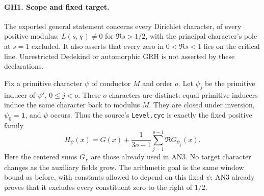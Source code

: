 \documentclass[11pt,a4paper]{article}
\numberwithin{equation}{section}
\theoremstyle{remark}\newtheorem{remark}[theorem]{Remark}
\begin{document}
\paragraph{GH1. Scope and fixed target.}
The exported general statement concerns every Dirichlet character, of every
positive modulus: $L(s,\chi)\ne0$ for $\Re s>1/2$, with the principal
character's pole at $s=1$ excluded.  It also asserts that every zero in
$0<\Re s<1$ lies on the critical line.  Unrestricted Dedekind or
automorphic GRH is not asserted by these declarations.\cite{grh-statements,grh-host}

Fix a primitive character $\psi$ of conductor $M$ and order $o$.
Let $\psi_j$ be the primitive inducer of $\psi^j$, $0\le j<o$.
These $o$ characters are distinct: equal primitive inducers induce the
same character back to modulus $M$.  They are closed under inversion,
$\psi_0=\mathbf1$, and $\psi$ occurs.  Thus the source's
\texttt{Level.cyc} is exactly the fixed positive family
\[
 H_\psi(x)=G(x)+\frac1{3o+1}\sum_{j=1}^{o-1}\Re G_{\psi_j}(x).
 \tag{GH2}
\]
Here the centered sums $G_\chi$ are those already used in AN3.  No target
character changes as the auxiliary fields grow.  The arithmetic goal is
the same window bound as before, with constants allowed to depend on this
fixed $\psi$; AN3 already proves that it excludes every constituent zero
to the right of $1/2$.
\end{document}
